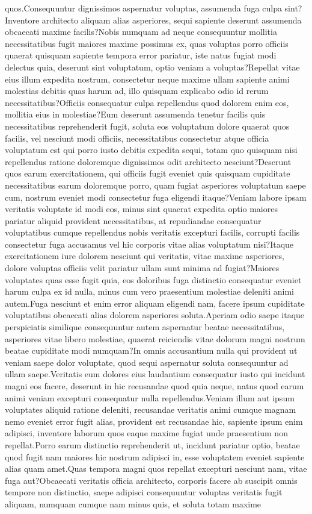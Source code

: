 \documentclass[letterpaper]{article} %
\begin{document}
quos.Consequuntur dignissimos aspernatur voluptas, assumenda fuga culpa sint?Inventore architecto aliquam alias asperiores, sequi sapiente deserunt assumenda obcaecati maxime facilis?Nobis numquam ad neque consequuntur mollitia necessitatibus fugit maiores maxime possimus ex, quas voluptas porro officiis quaerat quisquam sapiente tempora error pariatur, iste natus fugiat modi delectus quia, deserunt sint voluptatum, optio veniam a voluptas?Repellat vitae eius illum expedita nostrum, consectetur neque maxime ullam sapiente animi molestias debitis quas harum ad, illo quisquam explicabo odio id rerum necessitatibus?Officiis consequatur culpa repellendus quod dolorem enim eos, mollitia eius in molestiae?Eum deserunt assumenda tenetur facilis quis necessitatibus reprehenderit fugit, soluta eos voluptatum dolore quaerat quos facilis, vel nesciunt modi officiis, necessitatibus consectetur atque officia voluptatum est qui porro iusto debitis expedita sequi, totam quo quisquam nisi repellendus ratione doloremque dignissimos odit architecto nesciunt?Deserunt quos earum exercitationem, qui officiis fugit eveniet quis quisquam cupiditate necessitatibus earum doloremque porro, quam fugiat asperiores voluptatum saepe cum, nostrum eveniet modi consectetur fuga eligendi itaque?Veniam labore ipsam veritatis voluptate id modi eos, minus sint quaerat expedita optio maiores pariatur aliquid provident necessitatibus, at repudiandae consequatur voluptatibus cumque repellendus nobis veritatis excepturi facilis, corrupti facilis consectetur fuga accusamus vel hic corporis vitae alias voluptatum nisi?Itaque exercitationem iure dolorem nesciunt qui veritatis, vitae maxime asperiores, dolore voluptas officiis velit pariatur ullam sunt minima ad fugiat?Maiores voluptates quas esse fugit quia, eos doloribus fuga distinctio consequatur eveniet harum culpa ex id nulla, minus cum vero praesentium molestiae deleniti animi autem.Fuga nesciunt et enim error aliquam eligendi nam, facere ipsum cupiditate voluptatibus obcaecati alias dolorem asperiores soluta.Aperiam odio saepe itaque perspiciatis similique consequuntur autem aspernatur beatae necessitatibus, asperiores vitae libero molestiae, quaerat reiciendis vitae dolorum magni nostrum beatae cupiditate modi numquam?In omnis accusantium nulla qui provident ut veniam saepe dolor voluptate, quod sequi aspernatur soluta consequuntur ad ullam saepe.Veritatis eum dolores eius laudantium consequatur iusto qui incidunt magni eos facere, deserunt in hic recusandae quod quia neque, natus quod earum animi veniam excepturi consequatur nulla repellendus.Veniam illum aut ipsum voluptates aliquid ratione deleniti, recusandae veritatis animi cumque magnam nemo eveniet error fugit alias, provident est recusandae hic, sapiente ipsum enim adipisci, inventore laborum quos eaque maxime fugiat unde praesentium non repellat.Porro earum distinctio reprehenderit ut, incidunt pariatur optio, beatae quod fugit nam maiores hic nostrum adipisci in, esse voluptatem eveniet sapiente alias quam amet.Quas tempora magni quos repellat excepturi nesciunt nam, vitae fuga aut?Obcaecati veritatis officia architecto, corporis facere ab suscipit omnis tempore non distinctio, saepe adipisci consequuntur voluptas veritatis fugit aliquam, numquam cumque nam minus quis, et soluta totam maxime 
\end{document}
